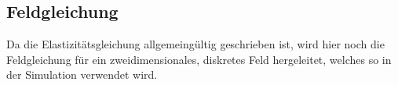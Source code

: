 \subsection{Feldgleichung}
Da die Elastizitätsgleichung allgemeingültig geschrieben ist, %
wird hier noch die Feldgleichung für ein zweidimensionales, diskretes Feld hergeleitet,
welches so in der Simulation verwendet wird.





